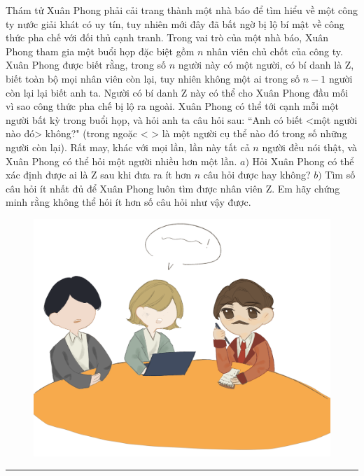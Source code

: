 \begin{multicols}{2}
	Thám tử Xuân Phong phải cải trang thành một nhà báo để tìm hiểu về một công ty nước giải khát có uy tín, tuy nhiên mới đây đã bất ngờ bị lộ bí mật về công thức pha chế với đối thủ cạnh tranh. Trong vai trò của một nhà báo, Xuân Phong tham gia một buổi họp đặc biệt gồm $n$ nhân viên chủ chốt của công ty. Xuân Phong được biết rằng, trong số $n$ người này có một người, có bí danh là Z, biết toàn bộ mọi nhân viên còn lại, tuy nhiên không một ai trong số $n-1$ người còn lại lại biết anh ta. Người có bí danh Z này có thể cho Xuân Phong đầu mối vì sao công thức pha chế bị lộ ra ngoài.
	\vskip 0.1cm
	Xuân Phong có thể tới cạnh mỗi một người bất kỳ trong buổi họp, và hỏi anh ta câu hỏi sau: ``Anh có biết <một người nào đó> không?" (trong ngoặc < > là một người cụ thể nào đó trong số những người còn lại). Rất may, khác với mọi lần, lần này  tất cả $n$ người đều nói thật, và Xuân Phong có thể hỏi một người nhiều hơn một lần.
	\vskip 0.1cm
	$a)$ Hỏi Xuân Phong có thể xác định được ai là Z sau khi đưa ra ít hơn $n$ câu hỏi được hay không?
	\vskip 0.1cm
	$b)$ Tìm số câu hỏi ít nhất đủ để Xuân Phong luôn tìm được nhân viên Z. Em hãy chứng minh rằng không thể hỏi ít hơn số câu hỏi như vậy được.
	\begin{figure}[H]
		\centering
		\vspace*{-10pt}
		\captionsetup{labelformat= empty, justification=centering}
		\includegraphics[width=0.95\linewidth]{xp}
		\vspace*{-5pt}
	\end{figure}
\end{multicols}
\vspace*{-10pt}
{\color{toancuabi}\rule{1\linewidth}{0.1pt}}

